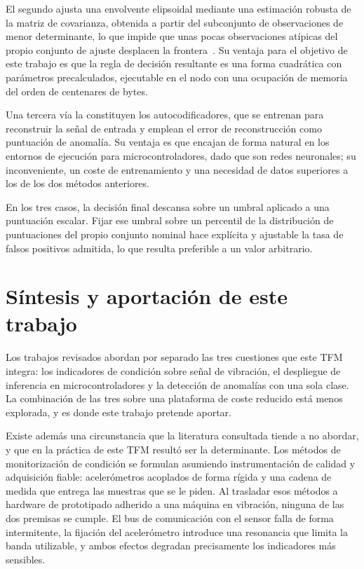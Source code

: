 El segundo ajusta una envolvente elipsoidal mediante una estimación robusta de la matriz de
covarianza, obtenida a partir del subconjunto de observaciones de menor determinante, lo que
impide que unas pocas observaciones atípicas del propio conjunto de ajuste desplacen la
frontera~\cite{rousseeuw1999}. Su ventaja para el objetivo de este trabajo es que la regla de
decisión resultante es una forma cuadrática con parámetros precalculados, ejecutable en el nodo
con una ocupación de memoria del orden de centenares de bytes.

Una tercera vía la constituyen los autocodificadores, que se entrenan para reconstruir la
señal de entrada y emplean el error de reconstrucción como puntuación de anomalía. Su ventaja
es que encajan de forma natural en los entornos de ejecución para microcontroladores, dado
que son redes neuronales; su inconveniente, un coste de entrenamiento y una necesidad de datos
superiores a los de los dos métodos anteriores.

En los tres casos, la decisión final descansa sobre un umbral aplicado a una puntuación
escalar. Fijar ese umbral sobre un percentil de la distribución de puntuaciones del propio
conjunto nominal hace explícita y ajustable la tasa de falsos positivos admitida, lo que
resulta preferible a un valor arbitrario.

\section{Síntesis y aportación de este trabajo}

Los trabajos revisados abordan por separado las tres cuestiones que este TFM integra: los
indicadores de condición sobre señal de vibración, el despliegue de inferencia en
microcontroladores y la detección de anomalías con una sola clase. La combinación de las tres
sobre una plataforma de coste reducido está menos explorada, y es donde este trabajo pretende
aportar.

Existe además una circunstancia que la literatura consultada tiende a no abordar, y que en la
práctica de este TFM resultó ser la determinante. Los métodos de monitorización de
condición se formulan asumiendo instrumentación de calidad y adquisición fiable: acelerómetros
acoplados de forma rígida y una cadena de medida que entrega las muestras que se le piden. Al
trasladar esos métodos a hardware de prototipado adherido a una máquina en vibración, ninguna
de las dos premisas se cumple. El bus de comunicación con el sensor falla de forma
intermitente, la fijación del acelerómetro introduce una resonancia que limita la banda
utilizable, y ambos efectos degradan precisamente los indicadores más sensibles.

